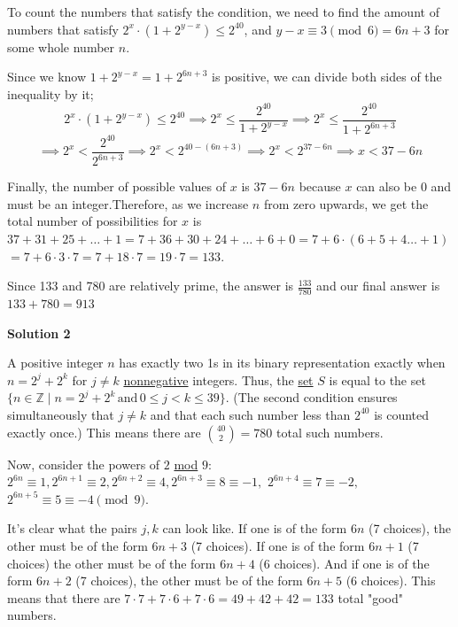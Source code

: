 \begin{enumerate}
 To count the numbers that satisfy the condition, we need to find the amount of numbers that satisfy $2^{x} \cdot (1+2^{y-x}) \leq 2^{40}$, and $y-x \equiv 3 \pmod 6 = 6n +3$ for some whole number $n$. 

 Since we know $1+2^{y-x} = 1+2^{6n+3}$ is positive, we can divide both sides of the inequality by it;
 \[2^{x} \cdot (1+2^{y-x}) \leq 2^{40} \implies 2^{x} \leq \frac{2^{40}}{1+2^{y-x}} \implies 2^{x} \leq \frac{2^{40}}{1+2^{6n+3}}\]
 \[\implies 2^{x} < \frac{2^{40}}{2^{6n+3}} \implies 2^{x} < 2^{40-(6n+3)}\implies 2^{x} < 2^{37-6n} \implies x < 37 - 6n\]

 Finally, the number of possible values of $x$ is $37-6n$ because $x$ can also be 0 and must be an integer.Therefore, as we increase $n$ from zero upwards, we get the total number of possibilities for $x$ is $37+31+25+\ldots+1 = 7 + 36 + 30 + 24 + \ldots + 6 + 0 = 7 + 6 \cdot (6 + 5 + 4\ldots + 1)$
$= 7 + 6 \cdot 3 \cdot 7 = 7 + 18 \cdot 7 = 19 \cdot 7 = 133$.

 Since 133 and 780 are relatively prime, the answer is $\frac{133}{780}$ and our final answer is $133+780 = \boxed{913}$




\textbf{Solution 2}

A positive integer $n$ has exactly two 1s in its binary representation exactly when $n = 2^j + 2^k$ for $j \neq k$ \href{https://artofproblemsolving.com/wiki/index.php?title=Nonnegative}{nonnegative} integers.  Thus, the \href{https://artofproblemsolving.com/wiki/index.php?title=Set}{set} $S$ is equal to the set $\{n \in \mathbb{Z} \mid n = 2^j + 2^k \,\mathrm{ and }\, 0 \leq j < k \leq 39\}$.  (The second condition ensures simultaneously that $j \neq k$ and that each such number less than $2^{40}$ is counted exactly once.)  This means there are ${40 \choose 2} = 780$ total such numbers.

 Now, consider the powers of $2$ \href{https://artofproblemsolving.com/wiki/index.php?title=Modular\_arithmetic}{ mod} $9$: $2^{6n} \equiv 1, 2^{6n + 1} \equiv 2, 2^{6n + 2} \equiv 4, 2^{6n + 3} \equiv 8 \equiv -1,$ $2^{6n + 4} \equiv 7 \equiv -2,$ $2^{6n + 5} \equiv 5 \equiv -4 \pmod 9$.  

 It's clear what the pairs $j, k$ can look like.  If one is of the form $6n$ (7 choices), the other must be of the form $6n + 3$ (7 choices).  If one is of the form $6n + 1$ (7 choices) the other must be of the form $6n + 4$ (6 choices).  And if one is of the form $6n + 2$ (7 choices), the other must be of the form $6n + 5$ (6 choices).  This means that there are $7\cdot 7 + 7\cdot 6 + 7\cdot 6 = 49 + 42 +42 = 133$ total "good" numbers.


\end{enumerate}
